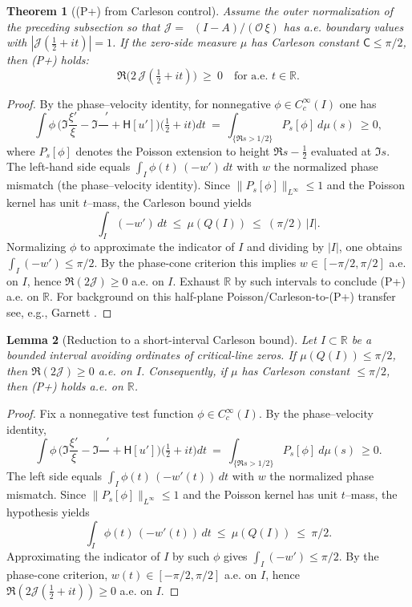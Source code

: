\documentclass[11pt]{article}
\newtheorem{theorem}{Theorem}
\newtheorem{lemma}[theorem]{Lemma}
\theoremstyle{definition}
\theoremstyle{remark}
\newcommand{\R}{\mathbb{R}}
\DeclareMathOperator{\dettwo}{det_2}
\begin{document}
\begin{theorem}[(P+) from Carleson control]\label{thm:Pplus-from-Carleson}
Assume the outer normalization of the preceding subsection so that \(\mathcal J=\dettwo(I-A)/(\mathcal O\,\xi)\) has a.e. boundary values with \(|\mathcal J(\tfrac12+it)|=1\). If the zero-side measure \(\mu\) has Carleson constant \(\mathsf C\le \pi/2\), then \emph{(P+)} holds:
\[
 \Re\big(2\,\mathcal J(\tfrac12+it)\big)\ \ge\ 0\quad\text{for a.e. }t\in\R.
\]
\end{theorem}
\begin{proof}
By the phase--velocity identity, for nonnegative \(\phi\in C_c^\infty(I)\) one has
\[
 \int\!\phi\,\Big(\Im\frac{\xi'}{\xi}-\Im\frac{\dettwo'}{\dettwo}+\mathsf H[u']\Big)\Big(\tfrac12+it\Big)dt\ =\ \int_{\{\Re s>1/2\}} P_{s}\![\phi] \ d\mu(s)\ \ge 0,
\]
where \(P_{s}[\phi]\) denotes the Poisson extension to height \(\Re s-\tfrac12\) evaluated at \(\Im s\). The left-hand side equals \(\int_I \phi(t)\,(-w')\,dt\) with \(w\) the normalized phase mismatch (the phase--velocity identity). Since \(\|P_{s}[\phi]\|_{L^\infty}\le 1\) and the Poisson kernel has unit \(t\)–mass, the Carleson bound yields
\[
 \int_I (-w')\,dt\ \le\ \mu(Q(I))\ \le\ (\pi/2)\,|I|.
\]
Normalizing \(\phi\) to approximate the indicator of \(I\) and dividing by \(|I|\), one obtains \(\int_I (-w')\le \pi/2\). By the phase-cone criterion this implies \(w\in[-\pi/2,\pi/2]\) a.e. on \(I\), hence \(\Re(2\mathcal J)\ge 0\) a.e. on \(I\). Exhaust \(\R\) by such intervals to conclude (P+) a.e. on \(\R\). For background on this half-plane Poisson/Carleson-to-(P+) transfer see, e.g., Garnett \cite[Ch.~IV]{Garnett}.
\end{proof}
\begin{lemma}[Reduction to a short-interval Carleson bound]\label{lem:no-P}
Let \(I\subset\R\) be a bounded interval avoiding ordinates of critical-line zeros. If \(\mu(Q(I))\le \pi/2\), then \(\Re(2\mathcal J)\ge 0\) a.e. on \(I\). Consequently, if \(\mu\) has Carleson constant \(\le \pi/2\), then \emph{(P+)} holds a.e. on \(\R\).
\end{lemma}
\begin{proof}
Fix a nonnegative test function \(\phi\in C_c^\infty(I)\). By the phase--velocity identity,
\[
 \int\!\phi\,\Big(\Im\frac{\xi'}{\xi}-\Im\frac{\dettwo'}{\dettwo}+\mathsf H[u']\Big)\Big(\tfrac12+it\Big)dt
 \ =\ \int_{\{\Re s>1/2\}} P_{s}[\phi] \ d\mu(s)\ \ge 0.
\]
The left side equals \(\int_I \phi(t)\,(-w'(t))\,dt\) with \(w\) the normalized phase mismatch. Since \(\|P_{s}[\phi]\|_{L^\infty}\le 1\) and the Poisson kernel has unit \(t\)–mass, the hypothesis yields
\[
 \int_I \phi(t)\,(-w'(t))\,dt\ \le\ \mu(Q(I))\ \le\ \pi/2.
\]
Approximating the indicator of \(I\) by such \(\phi\) gives \(\int_I (-w')\le \pi/2\). By the phase-cone criterion, \(w(t)\in[-\pi/2,\pi/2]\) a.e. on \(I\), hence \(\Re(2\mathcal J(\tfrac12+it))\ge 0\) a.e. on \(I\).
\end{proof}
\end{document}

